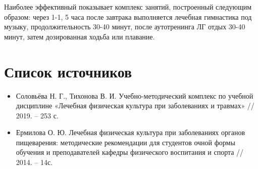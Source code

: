 \documentclass[a4paper]{article}
\begin{document}
    Наиболее эффективный показывает комплекс занятий, построенный следующим образом: через 1-1, 5 часа после завтрака выполняется лечебная гимнастика под музыку, продолжительность 30-40 минут, после аутотренинга ЛГ отдых 30-40 минут, затем дозированная ходьба или плавание.

    \newpage
    
    \section{Список источников}

    \begin{itemize}
        \item Соловьёва Н. Г., Тихонова В. И. Учебно-методический комплекс по учебной дисциплине «Лечебная физическая культура при заболеваниях и травмах» // 2019. – 253 с.
        \item Ермилова О. Ю. Лечебная физическая культура при заболеваниях органов пищеварения: методические рекомендации для студентов очной формы обучения и преподавателей кафедры физического воспитания и спорта // 2014. – 14с.
    \end{itemize}
\end{document}
